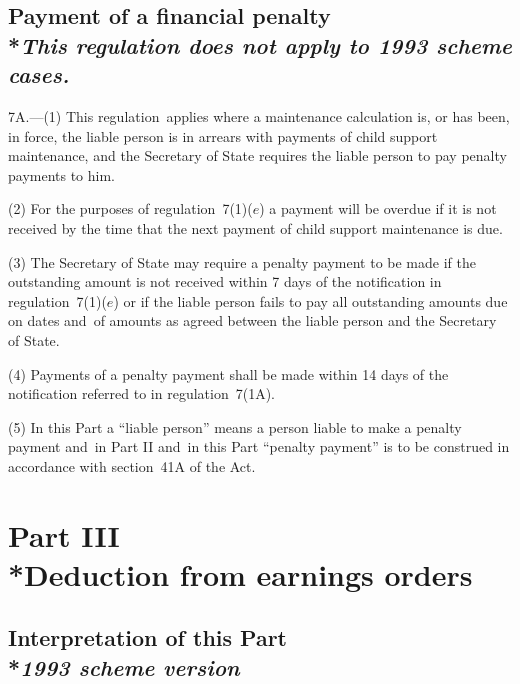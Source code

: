 \documentclass[12pt,a4paper]{article}
\begin{document}
\subsection[7A. Payment of a financial penalty]{Payment of a financial penalty\\*\emph{This regulation does not apply to 1993 scheme cases.}}

7A.---(1)  This regulation~applies where a maintenance calculation is, or has been, in force, the liable person is in arrears with payments of child support maintenance, and the Secretary of State requires the liable person to pay penalty payments to him.

(2) For the purposes of regulation~7(1)($e$)  a payment will be overdue if it is not received by the time that the next payment of child support maintenance is due.

(3) The Secretary of State may require a penalty payment to be made if the outstanding amount is not received within 7 days of the notification in regulation~7(1)($e$)  or if the liable person fails to pay all outstanding amounts due on dates and~of amounts as agreed between the liable person and the Secretary of State.

(4) Payments of a penalty payment shall be made within 14 days of the notification referred to in regulation~7(1A).

(5) In this Part a “liable person” means a person liable to make a penalty payment and~in Part II and~in this Part “penalty payment” is to be construed in accordance with section~41A of the Act.


\section[Part III --- Deduction from earnings orders]{Part III\\*Deduction from earnings orders}

\renewcommand\parthead{--- Part III}

\subsection[8. Interpretation of this Part --- \emph{1993 scheme version}]{Interpretation of this Part\\*\emph{1993 scheme version}}
\end{document}
